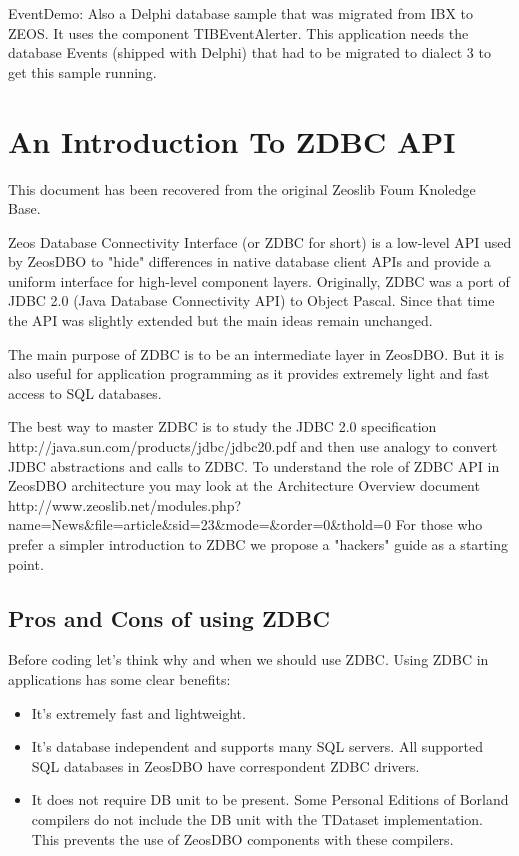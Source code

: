 \documentclass[a4paper,12pt,oneside]{book}
\begin{document}
EventDemo:
Also a Delphi database sample that was migrated from IBX to ZEOS.
It uses the component TIBEventAlerter.
This application needs the database Events (shipped with Delphi) that had to be migrated to dialect 3 to get this sample running.

\part{An Introduction To ZDBC API}
This document has been recovered from the original Zeoslib Foum Knoledge Base.

Zeos Database Connectivity Interface (or ZDBC for short) is a low-level API used by ZeosDBO to "hide" differences in native database client APIs and provide a uniform interface for high-level component layers. Originally, ZDBC was a port of JDBC 2.0 (Java Database Connectivity API) to Object Pascal. Since that time the API was slightly extended but the main ideas remain unchanged.

The main purpose of ZDBC is to be an intermediate layer in ZeosDBO. But it is also useful for application programming as it provides extremely light and fast access to SQL databases.

The best way to master ZDBC is to study the JDBC 2.0 specification http://java.sun.com/products/jdbc/jdbc20.pdf and then use analogy to convert JDBC abstractions and calls to ZDBC. To understand the role of ZDBC API in ZeosDBO architecture you may look at the Architecture Overview document http://www.zeoslib.net/modules.php?name=News\&file=article\&sid=23\&mode=\&order=0\&thold=0 For those who prefer a simpler introduction to ZDBC we propose a "hackers" guide as a starting point. 

\chapter{Pros and Cons of using ZDBC}
Before coding let's think why and when we should use ZDBC. Using ZDBC in applications has some clear benefits:
\begin{itemize}
  \item It's extremely fast and lightweight.
  \item It's database independent and supports many SQL servers. All supported SQL databases in ZeosDBO have correspondent ZDBC drivers.
  \item It does not require DB unit to be present. Some Personal Editions of Borland compilers do not include the DB unit with the TDataset implementation. This prevents the use of ZeosDBO components with these compilers.
\end{itemize}
\end{document}
